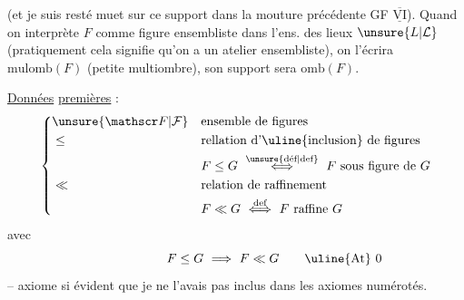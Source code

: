 (et je suis resté muet sur ce support dans la mouture précédente GF $\underline{\overline{\mathrm{VI}}}$). Quand on interprète $F$ comme figure ensembliste dans l'ens. des lieux $\unsure{L|\mathcal L}$  (pratiquement cela signifie qu'on a un atelier ensembliste), on l'écrira $\mathrm{mulomb}(F)$ (petite multiombre), son support sera $\mathrm{omb}(F)$.

\uline{Données} \uline{premières} :
\[
\left\{\begin{aligned}
&\unsure{\mathscr F|\mathcal F} &&\text{ensemble de figures}\\
&\leq &&\text{rellation d'\uline{inclusion} de figures}\\
& &&F\leq G\ \overset{\text{\unsure{déf|def}}}{\Longleftrightarrow}\ F\ \text{sous figure de }G\\
&\ll &&\text{relation de raffinement}\\
& && F\ll G\ \overset{\text{def}}{\Longleftrightarrow}\ F\ \text{raffine }G
\end{aligned}\right.
\]
avec
\[
F\leq G\ \Longrightarrow\ F\ll G\tag*{\makebox[0pt][r]{\makebox[\displaywidth][l]{\uline{At} 0}}}
\]
-- axiome si évident que je ne l'avais pas inclus dans les axiomes numérotés.


